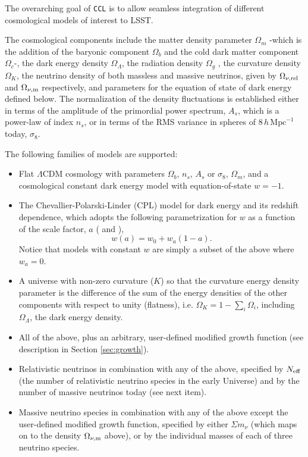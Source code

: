 \documentclass[\docopts]{\docclass}
\newcommand{\ccl}{{\tt CCL}\xspace}
\begin{document}
The overarching goal of \ccl is to allow seamless integration of different cosmological models of interest to LSST.

The cosmological components include the matter density parameter $\Omega_m$ -which is the addition of the baryonic component $\Omega_b$ and the cold dark matter component $\Omega_c$-, the dark energy density $\Omega_\Lambda$, the radiation density $\Omega_g$ , the curvature density $\Omega_K$, the neutrino density of both massless and massive neutrinos, given by $\Omega_{\nu, {\rm rel}}$ and $\Omega_{\nu, {\rm m}}$ respectively, and parameters for the equation of state of dark energy defined below. The normalization of the density fluctuations is established either in terms of the amplitude of the primordial power spectrum, $A_s$, which is a power-law of index $n_s$, or in terms of the RMS variance in spheres of $8\,h\,\text{Mpc}^{-1}$ today, $\sigma_8$. 

The following families of models are supported:
\begin{itemize}
 \item Flat $\Lambda$CDM cosmology with parameters $\Omega_b$, $n_s$, $A_s$ or $\sigma_8$, $\Omega_m$, and a cosmological constant dark energy model with equation-of-state $w=-1$. 
\item The Chevallier-Polarski-Linder (CPL) model for dark energy and its redshift dependence, which adopts the following parametrization for $w$ as a function of the scale factor, $a$ (\citealt{Chevallier01} and \citealt{Linder03}),
  \begin{equation}
    w(a) = w_0+w_a(1-a).
  \end{equation}
  Notice that models with constant $w$ are simply a subset of the above where $w_a=0$.
 \item A universe with non-zero curvature ($K$) so that the curvature energy density parameter is the difference of the sum of the energy densities of the other components with respect to unity (flatness), i.e. $\Omega_K = 1- \sum_i \Omega_i$, including $\Omega_\Lambda$, the dark energy density.
 \item All of the above, plus an arbitrary, user-defined modified growth function (see description in Section \ref{sec:growth}).
 \item Relativistic neutrinos in combination with any of the above, specified by $N_{\rm eff}$ (the number of relativistic neutrino species in the early Universe) and by the number of massive neutrinos today (see next item).
  \item Massive neutrino species in combination with any of the above except the user-defined modified growth function, specified by either $\Sigma m_\nu$ (which maps on to the density $\Omega_{\nu, {\rm m}}$ above), or by the individual masses of each of three neutrino species.
\end{itemize}
\end{document}
